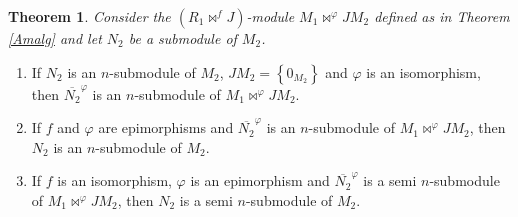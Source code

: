 \documentclass{amsart}%
\newtheorem{theorem}{Theorem}
\theoremstyle{plain}
\numberwithin{equation}{section}
\begin{document}
\begin{theorem}
\label{Amalg2}Consider the $(R_{1}\Join^{f}J)$-module $M_{1}\Join^{\varphi
}JM_{2}$ defined as in Theorem \ref{Amalg} and let $N_{2}$ be a submodule of
$M_{2}$.
\end{theorem}

\begin{enumerate}
\item If $N_{2}$ is an $n$-submodule of $M_{2}$, $JM_{2}=\left\{  0_{M_{2}%
}\right\}  $ and $\varphi$ is an isomorphism, then $\overline{N_{2}}^{\varphi
}$ is an $n$-submodule of $M_{1}\Join^{\varphi}JM_{2}$.

\item If $f$ and $\varphi$ are epimorphisms and $\overline{N_{2}}^{\varphi}$
is an $n$-submodule of $M_{1}\Join^{\varphi}JM_{2}$, then $N_{2}$ is an
$n$-submodule of $M_{2}$.

\item If $f$ is an isomorphism, $\varphi$ is an epimorphism and $\overline
{N_{2}}^{\varphi}$ is a semi $n$-submodule of $M_{1}\Join^{\varphi}JM_{2}$,
then $N_{2}$ is a semi $n$-submodule of $M_{2}$.
\end{enumerate}
\end{document}
